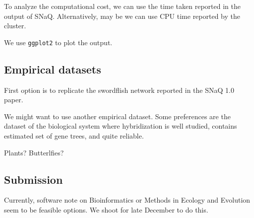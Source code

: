 \documentclass{article}
\begin{document}
To analyze the computational cost, we can use the time taken reported in the output of SNaQ. Alternatively, may be we can use CPU time reported by the cluster.

We use \texttt{ggplot2} to plot the output.

\subsection{Empirical datasets}
First option is to replicate the swordflish network reported in the SNaQ 1.0 paper.

We might want to use another empirical dataset. Some preferences are the dataset of the biological system where hybridization is well studied, contains estimated set of gene trees, and quite reliable.

Plants? Butterlfies?

\subsection{Submission}
Currently, software note on Bioinformatics or Methods in Ecology and Evolution seem to be feasible options. We shoot for late December to do this.
\end{document}
